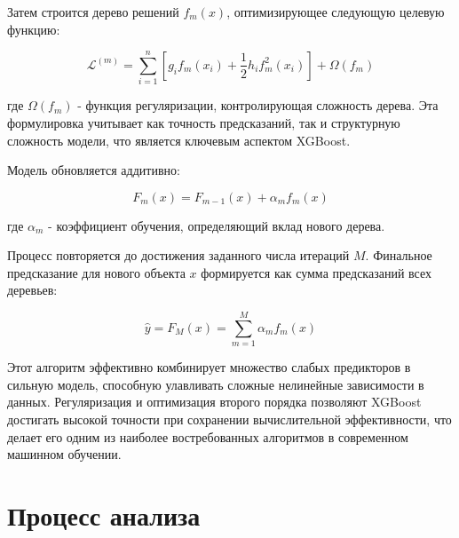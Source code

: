 Затем строится дерево решений $f_m(x)$, оптимизирующее следующую целевую функцию:

\[\mathcal{L}^{(m)} = \sum_{i=1}^n \left[ g_i f_m(x_i) + \frac{1}{2} h_i f_m^2(x_i) \right] + \Omega(f_m)\]

где $\Omega(f_m)$ - функция регуляризации, контролирующая сложность дерева. Эта формулировка учитывает как точность предсказаний, так и структурную сложность модели, что является ключевым аспектом XGBoost.

Модель обновляется аддитивно:

\[F_m(x) = F_{m-1}(x) + \alpha_m f_m(x)\]

где $\alpha_m$ - коэффициент обучения, определяющий вклад нового дерева.

Процесс повторяется до достижения заданного числа итераций $M$. Финальное предсказание для нового объекта $x$ формируется как сумма предсказаний всех деревьев:

\[\hat{y} = F_M(x) = \sum_{m=1}^M \alpha_m f_m(x)\]

Этот алгоритм эффективно комбинирует множество слабых предикторов в сильную модель, способную улавливать сложные нелинейные зависимости в данных. Регуляризация и оптимизация второго порядка позволяют XGBoost достигать высокой точности при сохранении вычислительной эффективности, что делает его одним из наиболее востребованных алгоритмов в современном машинном обучении.

\section{Процесс анализа}

